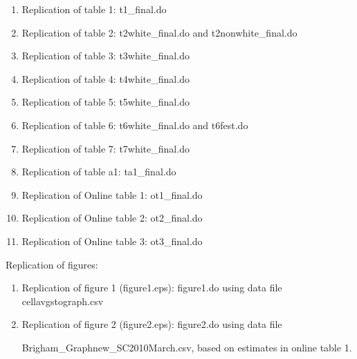 \documentclass[12pt]{article}
\begin{document}
\begin{enumerate}
\item Replication of table 1: t1\_final.do

\item Replication of table 2: t2white\_final.do and t2nonwhite\_final.do

\item Replication of table 3: t3white\_final.do

\item Replication of table 4: t4white\_final.do

\item Replication of table 5: t5white\_final.do

\item Replication of table 6: t6white\_final.do and t6fest.do

\item Replication of table 7: t7white\_final.do

\item Replication of table a1: ta1\_final.do

\item Replication of Online table 1: ot1\_final.do

\item Replication of Online table 2: ot2\_final.do

\item Replication of Online table 3: ot3\_final.do
\end{enumerate}

Replication of figures:

\begin{enumerate}
\item Replication of figure 1 (figure1.eps): figure1.do using data file
cellavgstograph.csv

\item Replication of figure 2 (figure2.eps): figure2.do using data file

Brigham\_Graphnew\_SC2010March.csv, based on estimates in online table 1.
\end{enumerate}
\end{document}
